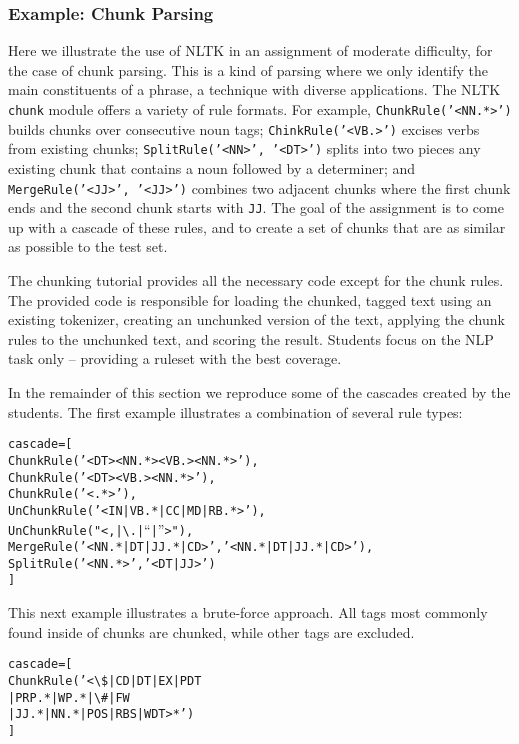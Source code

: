 \documentclass[11pt]{article}
\newenvironment{sv}{\scriptsize\begin{alltt}}{\end{alltt}\normalsize}
\begin{document}
\subsubsection*{Example: Chunk Parsing}

Here we illustrate the use of NLTK in an assignment of moderate
difficulty, for the case of chunk parsing.  This is a kind of parsing
where we only identify the main constituents of a phrase, a technique
with diverse applications.  The NLTK \texttt{chunk} module offers
a variety of rule formats.  For example,
\texttt{ChunkRule('<NN.*>')} builds chunks over consecutive noun tags;
\texttt{ChinkRule('<VB.>')} excises verbs from existing chunks;
\texttt{SplitRule('<NN>', '<DT>')} splits into two pieces any existing
chunk that contains a noun followed by a determiner; and
\texttt{MergeRule('<JJ>', '<JJ>')} combines two adjacent chunks
where the first chunk ends and the second chunk starts with \texttt{JJ}.
The goal of the assignment is to come up with a cascade of these rules,
and to create a set of chunks that are as similar as possible to the test set.

The chunking tutorial provides all the necessary code except for the
chunk rules.  The provided code is responsible for loading the
chunked, tagged text using an existing tokenizer, creating an
unchunked version of the text, applying the chunk rules to the
unchunked text, and scoring the result.  Students focus on the
NLP task only -- providing a ruleset with the best coverage.

In the remainder of this section we reproduce some of the cascades
created by the students.  The first example illustrates a combination
of several rule types:

\begin{sv}
cascade = [
  ChunkRule('<DT><NN.*><VB.><NN.*>'),
  ChunkRule('<DT><VB.><NN.*>'),
  ChunkRule('<.*>'),
  UnChunkRule('<IN|VB.*|CC|MD|RB.*>'),
  UnChunkRule("<,|{\textbackslash}.|``|''>"),
  MergeRule('<NN.*|DT|JJ.*|CD>', '<NN.*|DT|JJ.*|CD>'),
  SplitRule('<NN.*>', '<DT|JJ>')
]
\end{sv}

This next example illustrates a brute-force approach.  All tags most
commonly found inside of chunks are chunked, while other tags are excluded.

\begin{sv}
cascade = [
  ChunkRule('<{\textbackslash}\$|CD|DT|EX|PDT
             |PRP.*|WP.*|{\textbackslash}\#|FW
             |JJ.*|NN.*|POS|RBS|WDT>*')
]
\end{sv}
\end{document}
